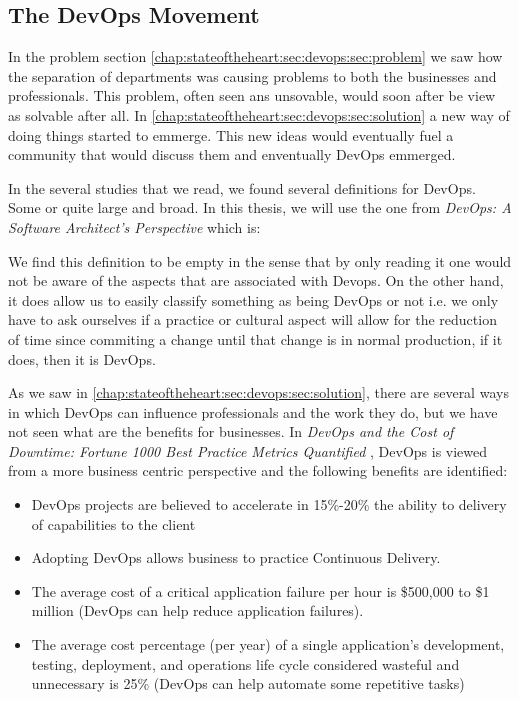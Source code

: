       \subsection{The DevOps Movement}
      In the problem section \ref{chap:stateoftheheart:sec:devops:sec:problem} we saw how the separation of departments was causing problems to both the businesses and professionals. This problem, often seen ans unsovable, would soon after be view as solvable after all. In \ref{chap:stateoftheheart:sec:devops:sec:solution} a new way of doing things started to emmerge. This new ideas would eventually fuel a community that would discuss them and enventually DevOps emmerged.

      In the several studies that we read, we found several definitions for DevOps. Some or quite large and broad. In this thesis, we will use the one from \textit{DevOps: A Software Architect's Perspective} \cite{Bass} which is:


      We find this definition to be empty in the sense that by only reading it one would not be aware of the aspects that are associated with Devops. On the other hand, it does allow us to easily classify something as being DevOps or not i.e. we only have to ask ourselves if a practice or cultural aspect will allow for the reduction of time since commiting a change until that change is in normal production, if it does, then it is DevOps.

      As we saw in \ref{chap:stateoftheheart:sec:devops:sec:solution}, there are several ways in which DevOps can influence professionals and the work they do, but we have not seen what are the benefits for businesses. In \textit{DevOps and the Cost of Downtime: Fortune 1000 Best Practice Metrics Quantified} \cite{Elliot2015}, DevOps is viewed from a more business centric perspective and the following benefits are identified:

		  \begin{itemize}
			    \item{DevOps projects are believed to accelerate in 15\%-20\% the ability to delivery of capabilities to the client }
          \item{Adopting DevOps allows business to practice Continuous Delivery.}
          \item{The average cost of a critical application failure per hour is \$500,000 to \$1 million (DevOps can help reduce application failures).}
          \item{The average cost percentage (per year) of a single application's development, testing, deployment, and operations life cycle considered wasteful and unnecessary is 25\% (DevOps can help automate some repetitive tasks)}
		  \end{itemize}

